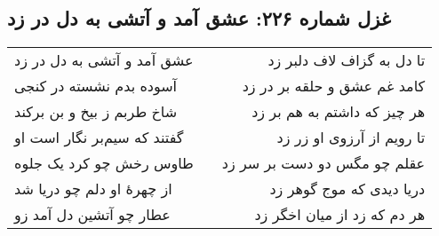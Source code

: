 \begin{center}
\section*{غزل شماره ۲۲۶: عشق آمد و آتشی به دل در زد}
\label{sec:226}
\begin{longtable}{l p{0.5cm} r}
عشق آمد و آتشی به دل در زد
&&
تا دل به گزاف لاف دلبر زد
\\
آسوده بدم نشسته در کنجی
&&
کامد غم عشق و حلقه بر در زد
\\
شاخ طربم ز بیخ و بن برکند
&&
هر چیز که داشتم به هم بر زد
\\
گفتند که سیم‌بر نگار است او
&&
تا رویم از آرزوی او زر زد
\\
طاوس رخش چو کرد یک جلوه
&&
عقلم چو مگس دو دست بر سر زد
\\
از چهرهٔ او دلم چو دریا شد
&&
دریا دیدی که موج گوهر زد
\\
عطار چو آتشین دل آمد زو
&&
هر دم که زد از میان اخگر زد
\\
\end{longtable}
\end{center}
